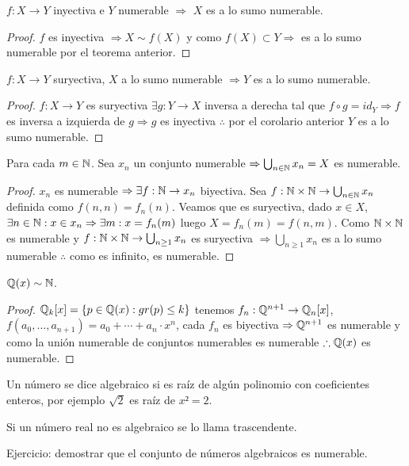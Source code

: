 \begin{corollary}
    \(f: X \to Y\) inyectiva e \(Y\) numerable \(\Rightarrow \) \(X\) es a lo sumo numerable.
    \begin{proof}
        \(f\) es inyectiva \(\Rightarrow X \sim f(X)\) y como \(f(X) \subset Y \Rightarrow \) es a lo sumo numerable por el teorema anterior.
    \end{proof}
\end{corollary}

\begin{theorem}
    \(f: X \to Y\) suryectiva, \(X\) a lo sumo numerable \(\Rightarrow Y\) es a lo sumo numerable.
    \begin{proof}
        \(f: X \to Y\) es suryectiva \(\exists g: Y \to X\) inversa a derecha tal que \(f \circ g = id_Y \Rightarrow f\) es inversa a izquierda de \(g \Rightarrow g\) es inyectiva \(\therefore \) por el corolario anterior \(Y\) es a lo sumo numerable.
    \end{proof}
\end{theorem}

\begin{theorem}
    Para cada \(m \in \mathbb{N} \). Sea \(x_n\) un conjunto numerable \(\Rightarrow \bigcup_{n \in \mathbb{N}}x_n = X\) es numerable.
    \begin{proof}
        \(x_n\) es numerable \(\Rightarrow \exists f:\mathbb{N} \to x_n\) biyectiva. Sea \(f:\mathbb{N} \times \mathbb{N} \to \bigcup_{n \in \mathbb{N}} x_n\) definida como \(f(n, n) = f_n(n)\). Veamos que es suryectiva, dado \(x \in X\), \(\exists n \in \mathbb{N}:x \in x_n \Rightarrow \exists m:x=f_n(m)\) luego \(X=f_n(m) = f(n, m)\). Como \(\mathbb{N} \times \mathbb{N} \) es numerable y \(f: \mathbb{N} \times \mathbb{N} \to \bigcup_{n \geq 1}{x_n} \) es suryectiva \(\Rightarrow \bigcup_{n \geq 1}x_n\) es a lo sumo numerable \(\therefore \) como es infinito, es numerable.
    \end{proof}
\end{theorem}

\begin{eg}
    \(\mathbb{Q}(x) \sim \mathbb{N} \).
    \begin{proof}
        \(\mathbb{Q}_k[x] = \{ p \in \mathbb{Q}(x) : gr(p) \leq k \} \) tenemos \(f_n : \mathbb{Q}^{n+1} \to \mathbb{Q}_n[x]\), \(f(a_0, \ldots, a_{n+1}) = a_0 + \cdots + a_n \cdot x^n\), cada \(f_n\) es biyectiva \(\Rightarrow \mathbb{Q}^{n+1} \) es numerable y como la unión numerable de conjuntos numerables es numerable \(\therefore \mathbb{Q}(x)\) es numerable.
    \end{proof}
\end{eg}

\begin{definition}
    Un número se dice algebraico si es raíz de algún polinomio con coeficientes enteros, por ejemplo \(\sqrt{2} \) es raíz de \(x² = 2\).
\end{definition}

\begin{definition}
    Si un número real no es algebraico se lo llama trascendente.
\end{definition}

Ejercicio: demostrar que el conjunto de números algebraicos es numerable.
